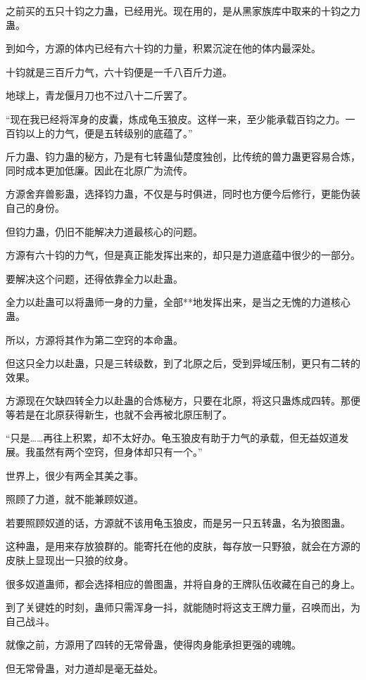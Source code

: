 \begin{this_body}
之前买的五只十钧之力蛊，已经用光。现在用的，是从黑家族库中取来的十钧之力蛊。

到如今，方源的体内已经有六十钧的力量，积累沉淀在他的体内最深处。

十钧就是三百斤力气，六十钧便是一千八百斤力道。

地球上，青龙偃月刀也不过八十二斤罢了。

“现在我已经将浑身的皮囊，炼成龟玉狼皮。这样一来，至少能承载百钧之力。一百钧以上的力气，便是五转级别的底蕴了。”

斤力蛊、钧力蛊的秘方，乃是有七转蛊仙楚度独创，比传统的兽力蛊更容易合炼，同时成本更加低廉。因此在北原广为流传。

方源舍弃兽影蛊，选择钧力蛊，不仅是与时俱进，同时也方便今后修行，更能伪装自己的身份。

但钧力蛊，仍旧不能解决力道最核心的问题。

方源有六十钧的力气，但是真正能发挥出来的，却只是力道底蕴中很少的一部分。

要解决这个问题，还得依靠全力以赴蛊。

全力以赴蛊可以将蛊师一身的力量，全部**地发挥出来，是当之无愧的力道核心蛊。

所以，方源将其作为第二空窍的本命蛊。

但这只全力以赴蛊，只是三转级数，到了北原之后，受到异域压制，更只有二转的效果。

方源现在欠缺四转全力以赴蛊的合炼秘方，只要在北原，将这只蛊炼成四转。那便等若是在北原获得新生，也就不会再被北原压制了。

“只是……再往上积累，却不太好办。龟玉狼皮有助于力气的承载，但无益奴道发展。我虽然有两个空窍，但身体却只有一个。”

世界上，很少有两全其美之事。

照顾了力道，就不能兼顾奴道。

若要照顾奴道的话，方源就不该用龟玉狼皮，而是另一只五转蛊，名为狼图蛊。

这种蛊，是用来存放狼群的。能寄托在他的皮肤，每存放一只野狼，就会在方源的皮肤上显现出一只狼的纹身。

很多奴道蛊师，都会选择相应的兽图蛊，并将自身的王牌队伍收藏在自己的身上。

到了关键姓的时刻，蛊师只需浑身一抖，就能随时将这支王牌力量，召唤而出，为自己战斗。

就像之前，方源用了四转的无常骨蛊，使得肉身能承担更强的魂魄。

但无常骨蛊，对力道却是毫无益处。


\end{this_body}
